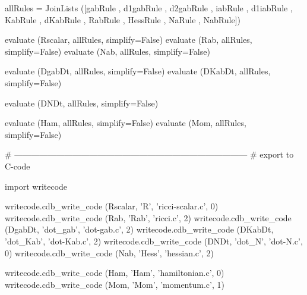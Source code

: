 \documentclass[12pt]{cdblatex}
\begin{document}
\begin{cadabra}
   allRules = JoinLists ([gabRule , d1gabRule , d2gabRule ,
                          iabRule , d1iabRule ,
                          KabRule , dKabRule ,
                          RabRule ,
                          HessRule , NaRule , NabRule])

   evaluate (Rscalar, allRules, simplify=False)
   evaluate (Rab,     allRules, simplify=False)
   evaluate (Nab,     allRules, simplify=False)

   evaluate (DgabDt,  allRules, simplify=False)
   evaluate (DKabDt,  allRules, simplify=False)

   evaluate (DNDt,    allRules, simplify=False)

   evaluate (Ham,     allRules, simplify=False)
   evaluate (Mom,     allRules, simplify=False)

   # ------------------------------------------------------------------------------------
   # export to C-code

   import writecode

   writecode.cdb_write_code (Rscalar, 'R',       'ricci-scalar.c', 0)
   writecode.cdb_write_code (Rab,     'Rab',     'ricci.c',        2)
   writecode.cdb_write_code (DgabDt,  'dot_gab', 'dot-gab.c',      2)
   writecode.cdb_write_code (DKabDt,  'dot_Kab', 'dot-Kab.c',      2)
   writecode.cdb_write_code (DNDt,    'dot_N',   'dot-N.c',        0)
   writecode.cdb_write_code (Nab,     'Hess',    'hessian.c',      2)

   writecode.cdb_write_code (Ham,     'Ham',     'hamiltonian.c',  0)
   writecode.cdb_write_code (Mom,     'Mom',     'momentum.c',     1)
\end{cadabra}
\end{document}
